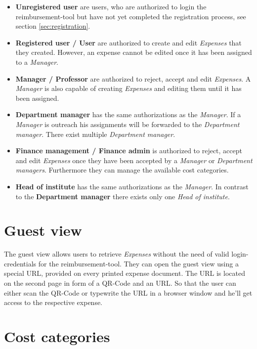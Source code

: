 \begin{itemize}
    \item \textbf{Unregistered user} are users, who are authorized to login the reimbursement-tool but have not yet completed the registration process, see section \ref{sec:registration}.
    \item \textbf{Registered user / User} are authorized to create and edit \textit{Expenses} that they created. However, an expense cannot be edited once it has been assigned to a \textit{Manager}.
    
    \item \textbf{Manager / Professor} are authorized to reject, accept and edit \textit{Expenses}. A \textit{Manager} is also capable of creating \textit{Expenses} and editing them until it has been assigned. 
    
    \item \textbf{Department manager} has the same authorizations as the \textit{Manager}. If a \textit{Manager} is outreach his assignments will be forwarded to the \textit{Department manager}. There exist multiple \textit{Department manager}.
    
    \item \textbf{Finance management / Finance admin} is authorized to reject, accept and edit \textit{Expenses} once they have been accepted by a \textit{Manager} or \textit{Department managers}. Furthermore they can manage the available cost categories.
    
    \item \textbf{Head of institute} has the same authorizations as the \textit{Manager}. In contrast to the \textbf{Department manager} there exists only one \textit{Head of institute}.
\end{itemize}

\section{Guest view}
The guest view allows users to retrieve \textit{Expenses} without the need of valid login-credentials for the reimbursement-tool. They can open the guest view using a special URL, provided on every printed expense document. The URL is located on the second page in form of a QR-Code and an URL. So that the user can either scan the QR-Code or typewrite the URL in a browser window and he'll get access to the respective expense.

\section{Cost categories}

